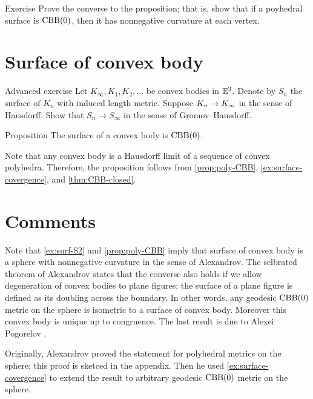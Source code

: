 \begin{thm}{Exercise}\label{ex:poly-CBB}
Prove the converse to the proposition;
that is, show that if a poyhedral surface is $\mathrm{CBB}(0)$, then it has nonnegative curvature at each vertex.
\end{thm}

\section{Surface of convex body}

\begin{thm}{Advanced exercise}\label{ex:surface-covergence}
Let $K_\infty,K_1,K_2,\dots$ be convex bodies in $\mathbb{E}^3$.
Denote by $S_n$ the surface of $K_n$ with induced length metric.
Suppose $K_n\z\to K_\infty$ in the sense of Hausdorff.
Show that $S_n\to S_\infty$ in the sense of Gromov--Hausdorff.
\end{thm}

\begin{thm}{Proposition}\label{prop:conv-surf-CBB(0)}
The surface of a convex body is $\mathrm{CBB}(0)$.
\end{thm}

Note that any convex body is a Hausdorff limit of a sequence of convex polyhedra.
Therefore, the proposition follows from \ref{prop:poly-CBB}, \ref{ex:surface-covergence}, and \ref{thm:CBB-closed}.

\section{Comments}

Note that \ref{ex:surf-S2} and \ref{prop:poly-CBB} imply that surface of convex body is a sphere with nonnegative curvature in the sense of Alexandrov.
The selbrated theorem of Alexandrov states that the converse also holds if we allow degeneration of convex bodies to plane figures;
the surface of a plane figure is defined as its doubling across the boundary.
In other words, any geodesic $\mathrm{CBB}(0)$ metric on the sphere is isometric to a surface of convex body.
Moreover this convex body is unique up to congruence.
The last result is due to Alexei Pogorelov \cite{pogorelov}.

Originally, Alexandrov proved the statement for polyhedral metrics on the sphere; this proof is sketced in the appendix.
Then he used \ref{ex:surface-covergence} to extend the result to arbitrary geodesic $\mathrm{CBB}(0)$ metric on the sphere.

